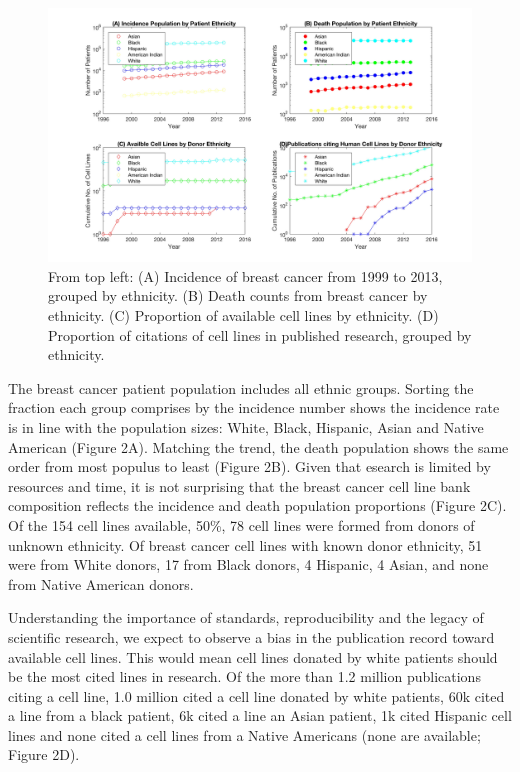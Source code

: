 \documentclass[11pt]{article}
\begin{document}
\begin{figure}[h!]
\centering
\includegraphics[width=1\columnwidth, trim = {10cm 0cm 10cm 0cm}, clip]{Figures/Timeline2x2.jpg}
\caption{\label{PS2} From top left: (A) Incidence of breast cancer from 1999 to 2013, grouped by ethnicity. (B) Death counts from breast cancer by ethnicity. (C) Proportion of available cell lines by ethnicity. (D) Proportion of citations of cell lines in published research, grouped by ethnicity.}%
\end{figure}

The breast cancer patient population includes all ethnic groups. Sorting the fraction each group comprises by the incidence number shows the incidence rate is in line with the population sizes: White, Black, Hispanic, Asian and Native American (Figure 2A). Matching the trend, the death population shows the same order from most populus to least (Figure 2B). Given that esearch is limited by resources and time, it is not surprising that the breast cancer cell line bank composition reflects the incidence and death population proportions (Figure 2C). Of the 154 cell lines available, 50\%, 78 cell lines were formed from donors of unknown ethnicity. Of breast cancer cell lines with known donor ethnicity, 51 were from White donors, 17 from Black donors, 4 Hispanic, 4 Asian, and none from Native American donors.

Understanding the importance of standards, reproducibility and the legacy of scientific research, we expect to observe a bias in the publication record toward available cell lines. This would mean cell lines donated by white patients should be the most cited lines in research. Of the more than 1.2 million publications citing a cell line, 1.0 million cited a cell line donated by white patients, 60k cited a line from a black patient, 6k cited a line an Asian patient, 1k cited Hispanic cell lines and none cited a cell lines from a Native Americans (none are available; Figure 2D).
\end{document}
